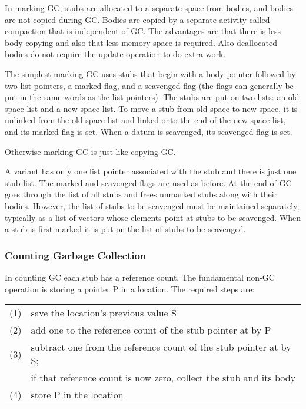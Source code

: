 \documentclass[12pt]{article}
\begin{document}
In marking GC, stubs are allocated to a separate space
from bodies, and bodies are not copied during GC.
Bodies are copied by a separate activity called
compaction that is independent of GC.  The advantages
are that there is less body copying and also that less memory
space is required.  Also deallocated bodies do not
require the update operation to do extra work.

The simplest marking GC uses stubs that begin with
a body pointer followed by two list pointers,
a marked flag, and a scavenged flag (the flags can generally
be put in the same words as the list pointers).  The stubs are
put on two lists: an old space list and a new space
list.  To move a stub from old space to new space,
it is unlinked from the old space list and linked
onto the end of the new space list, and its marked
flag is set.  When a datum is scavenged, its scavenged
flag is set.

Otherwise marking GC is just like copying GC.

A variant has only one list pointer associated with
the stub and there is just one stub list.  The
marked and scavenged flags are used as before.
At the end of GC goes through the list of all stubs
and frees unmarked stubs along with their bodies.
However, the list of stubs to be scavenged must
be maintained separately, typically as a list of
vectors whose elements point at stubs to be scavenged.
When a stub is first marked it is put on the list
of stubs to be scavenged.

\subsubsection{Counting Garbage Collection}

In counting GC each stub has a reference
count.  The fundamental non-GC operation is storing
a pointer P in a location.  The required steps are:
\begin{center}
\begin{tabular}{rl}
(1) & save the location's previous value S \\
(2) & add one to the reference count of the stub pointer at by P \\
(3) & subtract one from the reference count of the stub pointer at by S; \\
    & if that reference count is now zero, collect the stub and its body \\
(4) & store P in the location
\end{tabular}
\end{center}
\end{document}
